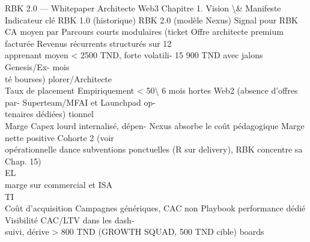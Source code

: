 \documentclass[12pt,landscape,a4paper]{article}
\begin{document}
RBK 2.0 — Whitepaper Architecte Web3                                                                      Chapitre 1. Vision \textbackslash{}& Manifeste\\
\vspace{0.5em}
\vspace{0.5em}
\vspace{0.5em}
Indicateur clé       RBK 1.0 (historique)                RBK 2.0 (modèle Nexus)              Signal pour RBK\\
CA moyen par         Parcours courts modulaires (ticket Offre architecte premium facturée Revenus récurrents structurés sur 12\\
apprenant            moyen \textless{} 2500 TND, forte volatili- 15 900 TND avec jalons Genesis/Ex- mois\\
té bourses)                        plorer/Architecte\\
Taux de placement Empiriquement \textless{} 50\textbackslash{}%
6 mois            hortes Web2 (absence d’offres par- Superteam/MFAI et Launchpad op-\\
tenaires dédiées)                  tionnel\\
Marge                Capex lourd internalisé, dépen- Nexus absorbe le coût pédagogique Marge nette positive Cohorte 2 (voir\\
opérationnelle       dance subventions ponctuelles   (R sur delivery), RBK concentre sa Chap. 15)\\
\vspace{0.5em}
\vspace{0.5em}
\vspace{0.5em}
\vspace{0.5em}
EL\\
marge sur commercial et ISA\\
\vspace{0.5em}
\vspace{0.5em}
\vspace{0.5em}
\vspace{0.5em}
TI\\
Coût d’acquisition   Campagnes génériques, CAC non Playbook    performance dédié Visibilité CAC/LTV dans les dash-\\
suivi, dérive \textgreater{} 800 TND       (GROWTH SQUAD, 500 TND cible) boards\\
\vspace{0.5em}
\vspace{0.5em}
\end{document}
